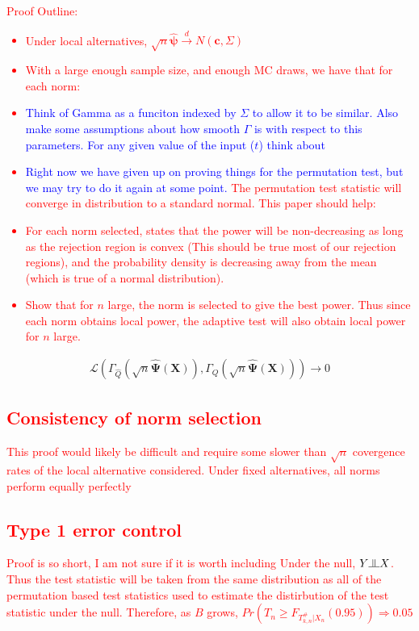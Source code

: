 \documentclass{article}
\newcommand{\sh}{\textcolor{red}}
\newcommand{\indep}{\raisebox{0.05em}{\rotatebox[origin=c]{90}{$\models$}}}
\newcommand{\rvo}{X}
\newcommand{\distv}{Q}
\begin{document}
\sh{Proof Outline: \\
\begin{itemize}
	\item Under local alternatives, $\sqrt{n}\hat{\boldsymbol{\psi}} \xrightarrow{d} N(\boldsymbol{c}, \Sigma)$
	\item With a large enough sample size, and enough MC draws, we have that for each norm: 
    \item \textcolor{blue}{Think of Gamma as a funciton indexed by $\Sigma$ to allow it to be similar.  Also make some assumptions about how smooth $\Gamma$ is with respect to this parameters. For any given value of the input ($t$) think about }
	\item \textcolor{blue}{Right now we have given up on proving things for the permutation test, but we may try to do it again at some point.} The permutation test statistic will converge in distribution to a standard normal.  This paper should help: \citep{omelka_testing_2012}
	\item For each norm selected, \citep{gupta_inequalitites_1972} states that the power will be non-decreasing as long as the rejection region is convex (This should be true most of our rejection regions), and the probability density is decreasing away from the mean (which is true of a normal distribution).  
	\item Show that for $n$ large, the norm is selected to give the best power.  Thus since each norm obtains local power, the adaptive test will also obtain local power for $n$ large.
\end{itemize}} 
\begin{align*}
	\mathcal{L}\left(\Gamma_{\hat{\distv}}\left(\sqrt{n} \hat{\boldsymbol{\Psi}}(\boldsymbol{X})\right), \Gamma_{\distv}\left(\sqrt{n} \hat{\boldsymbol{\Psi}}(\boldsymbol{X})\right)\right) \rightarrow 0
\end{align*}

\sh{\subsection{Consistency of norm selection} 
This proof would likely be difficult and require some slower than $\sqrt{n}$ covergence rates of the local alternative considered.  Under fixed alternatives, all norms perform equally perfectly}

\sh{\subsection{Type 1 error control}
Proof is so short, I am not sure if it is worth including
Under the null, $Y \indep \rvo$.  Thus the test statistic will be taken from the same distribution as all of the permutation based test statistics used to estimate the distirbution of the test statistic under the null.  Therefore, as $B$ grows, $Pr(T_n \geq F_{T^\#_{k,n}|\rvo_n}(0.95)) \Rightarrow 0.05$
}
\end{document}
